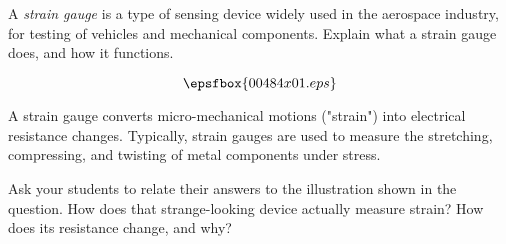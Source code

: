 

A {\it strain gauge} is a type of sensing device widely used in the aerospace industry, for testing of vehicles and mechanical components.  Explain what a strain gauge does, and how it functions.

$$\epsfbox{00484x01.eps}$$







A strain gauge converts micro-mechanical motions ("strain") into electrical resistance changes.  Typically, strain gauges are used to measure the stretching, compressing, and twisting of metal components under stress.







Ask your students to relate their answers to the illustration shown in the question.  How does that strange-looking device actually measure strain?  How does its resistance change, and why?




